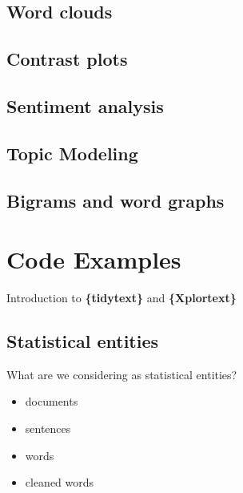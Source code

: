\documentclass[
]{book}
\providecommand{\tightlist}{%
  \setlength{\itemsep}{0pt}\setlength{\parskip}{0pt}}
\begin{document}
\hypertarget{word-clouds}{%
\subsection{Word clouds}\label{word-clouds}}

\hypertarget{contrast-plots}{%
\subsection{Contrast plots}\label{contrast-plots}}

\hypertarget{sentiment-analysis}{%
\subsection{Sentiment analysis}\label{sentiment-analysis}}

\hypertarget{topic-modeling}{%
\subsection{Topic Modeling}\label{topic-modeling}}

\hypertarget{bigrams-and-word-graphs}{%
\subsection{Bigrams and word graphs}\label{bigrams-and-word-graphs}}

\hypertarget{code-examples-1}{%
\section{Code Examples}\label{code-examples-1}}

Introduction to \textbf{\{tidytext\}} and \textbf{\{Xplortext\}}

\hypertarget{statistical-entities}{%
\subsection{Statistical entities}\label{statistical-entities}}

What are we considering as statistical entities?

\begin{itemize}
\tightlist
\item
  documents
\item
  sentences
\item
  words
\item
  cleaned words
\end{itemize}
\end{document}
